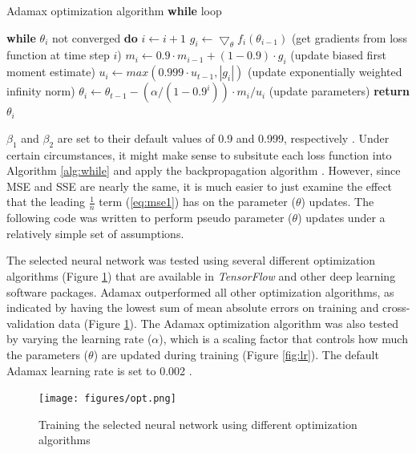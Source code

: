 \vspace{+0.6cm}
\begin{algorithm}[H]
  \centering
  \caption{Adamax optimization algorithm \textbf{while} loop \cite{kingma}}
  \label{alg:while}
  \begin{algorithmic}
    \STATE \textbf{while} $\theta_{i}$ not converged \textbf{do}
    \STATE \hspace{\algorithmicindent} $i \leftarrow i + 1$
    \STATE \hspace{\algorithmicindent} $g_{i} \leftarrow \bigtriangledown_{\theta} f_{i} (\theta_{i - 1})$ (get gradients from loss function at time step $i$)
    \STATE \hspace{\algorithmicindent} $m_{i} \leftarrow 0.9 \cdot m_{i - 1} + (1 - 0.9) \cdot g_{i}$ (update biased first moment estimate)
    \STATE \hspace{\algorithmicindent} $u_{i} \leftarrow max(0.999 \cdot u_{t - 1}, |g_{i}|)$ (update exponentially weighted infinity norm)
    \STATE \hspace{\algorithmicindent} $\theta_{i} \leftarrow \theta_{t - 1} - (\alpha / (1 - 0.9^{i})) \cdot m_{i} / u_{i}$ (update parameters)
    \STATE \textbf{return} $\theta_{i}$
  \end{algorithmic}
\end{algorithm}

$\beta_{1}$ and $\beta_{2}$ are set to their default values of 0.9 and 0.999, respectively \cite{kingma}.
Under certain circumstances, it might make sense to subsitute each loss function into Algorithm \ref{alg:while} and apply the backpropagation algorithm \cite{goodfellow}.
However, since MSE and SSE are nearly the same, it is much easier to just examine the effect that the leading $\frac{1}{n}$ term (\ref{eq:mse1}) has on the parameter ($\theta$) updates.
The following code was written to perform pseudo parameter ($\theta$) updates under a relatively simple set of assumptions.


The selected neural network was tested using several different optimization algorithms (Figure \ref{fig:opt}) that are available in \textit{TensorFlow} \cite{tensorflow} and other deep learning software packages.
Adamax \cite{kingma} outperformed all other optimization algorithms, as indicated by having the lowest sum of mean absolute errors on training and cross-validation data (Figure \ref{fig:opt}).
The Adamax optimization algorithm was also tested by varying the learning rate ($\alpha$), which is a scaling factor that controls how much the parameters ($\theta$) are updated during training (Figure \ref{fig:lr}).
The default Adamax learning rate is set to 0.002 \cite{tensorflow,chollet,kingma}.
%
\begin{figure}
  \centering
  \texttt{[image: figures/opt.png]}
  \caption{Training the selected neural network using different optimization algorithms}
  \label{fig:opt}
\end{figure}

